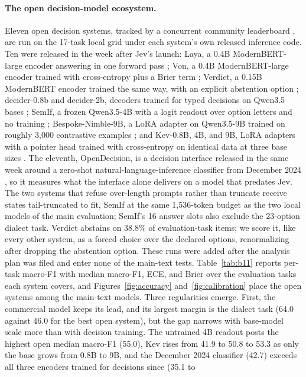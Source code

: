 \documentclass[11pt]{article}
\begin{document}
\begin{table}[!htbp]
\centering
\caption{Interface control: Gemini 3.8 Flash under the main free-text protocol against a JSON-schema-constrained rerun on identical items (macro-F1 and accuracy $\times 100$; Invalid counts unparseable or schema-violating answers).}
\label{tab:b15}
\small
\setlength{\tabcolsep}{4pt}

\end{table}

\paragraph{The open decision-model ecosystem.}
Eleven open decision systems, tracked by a concurrent community leaderboard \citep{jevbench2026}, are run on the 17-task local grid under each system's own released inference code. Ten were released in the week after Jev's launch: Laya, a 0.4B ModernBERT-large encoder answering in one forward pass \citep{kishor2026laya}; Von, a 0.4B ModernBERT-large encoder trained with cross-entropy plus a Brier term \citep{panisa2026von}; Verdict, a 0.15B ModernBERT encoder trained the same way, with an explicit abstention option \citep{kumar2026verdict}; decider-0.8b and decider-2b, decoders trained for typed decisions on Qwen3.5 bases \citep{mapika2026decider}; SemIf, a frozen Qwen3.5-4B with a logit readout over option letters and no training \citep{lee2026semif}; Bespoke-Nimble-9B, a LoRA adapter on Qwen3.5-9B trained on roughly 3{,}000 contrastive examples \citep{bespoke2026nimble}; and Kev-0.8B, 4B, and 9B, LoRA adapters with a pointer head trained with cross-entropy on identical data at three base sizes \citep{palmer2026kev}. The eleventh, OpenDecision, is a decision interface released in the same week around a zero-shot natural-language-inference classifier from December 2024 \citep{wadhwa2026opendecision,laurer2023building}, so it measures what the interface alone delivers on a model that predates Jev. The two systems that refuse over-length prompts rather than truncate receive states tail-truncated to fit, SemIf at the same 1{,}536-token budget as the two local models of the main evaluation; SemIf's 16 answer slots also exclude the 23-option dialect task. Verdict abstains on 38.8\% of evaluation-task items; we score it, like every other system, as a forced choice over the declared options, renormalizing after dropping the abstention option. These runs were added after the analysis plan was filed and enter none of the main-text tests. Table~\ref{tab:b11} reports per-task macro-F1 with median macro-F1, ECE, and Brier over the evaluation tasks each system covers, and Figures~\ref{fig:accuracy} and~\ref{fig:calibration} place the open systems among the main-text models. Three regularities emerge. First, the commercial model keeps its lead, and its largest margin is the dialect task (64.0 against 46.0 for the best open system), but the gap narrows with base-model scale more than with decision training. The untrained 4B readout posts the highest open median macro-F1 (55.0), Kev rises from 41.9 to 50.8 to 53.3 as only the base grows from 0.8B to 9B, and the December 2024 classifier (42.7) exceeds all three encoders trained for decisions since (35.1 to 
\end{document}
